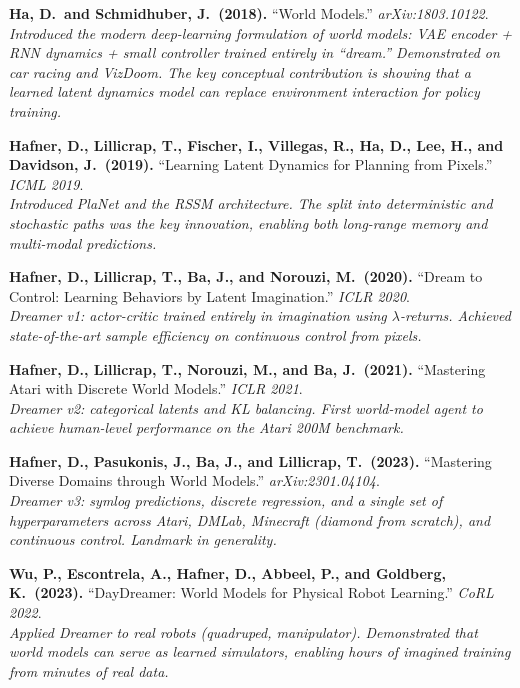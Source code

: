 \documentclass[11pt,a4paper]{article}
\theoremstyle{definition}
\begin{document}
\begin{enumerate}[label={[\arabic*]},leftmargin=2em]

\item \textbf{Ha, D.\ and Schmidhuber, J.\ (2018).}
  ``World Models.''
  \textit{arXiv:1803.10122}.\\
  \textit{Introduced the modern deep-learning formulation of world models:
  VAE encoder + RNN dynamics + small controller trained entirely in
  ``dream.'' Demonstrated on car racing and VizDoom. The key conceptual
  contribution is showing that a learned latent dynamics model can
  replace environment interaction for policy training.}

\item \textbf{Hafner, D., Lillicrap, T., Fischer, I., Villegas, R.,
  Ha, D., Lee, H., and Davidson, J.\ (2019).}
  ``Learning Latent Dynamics for Planning from Pixels.''
  \textit{ICML 2019}.\\
  \textit{Introduced PlaNet and the RSSM architecture. The split into
  deterministic and stochastic paths was the key innovation, enabling
  both long-range memory and multi-modal predictions.}

\item \textbf{Hafner, D., Lillicrap, T., Ba, J., and Norouzi, M.\ (2020).}
  ``Dream to Control: Learning Behaviors by Latent Imagination.''
  \textit{ICLR 2020}.\\
  \textit{Dreamer v1: actor-critic trained entirely in imagination using
  $\lambda$-returns. Achieved state-of-the-art sample efficiency on
  continuous control from pixels.}

\item \textbf{Hafner, D., Lillicrap, T., Norouzi, M., and Ba, J.\ (2021).}
  ``Mastering Atari with Discrete World Models.''
  \textit{ICLR 2021}.\\
  \textit{Dreamer v2: categorical latents and KL balancing. First world-model
  agent to achieve human-level performance on the Atari 200M benchmark.}

\item \textbf{Hafner, D., Pasukonis, J., Ba, J., and Lillicrap, T.\ (2023).}
  ``Mastering Diverse Domains through World Models.''
  \textit{arXiv:2301.04104}.\\
  \textit{Dreamer v3: symlog predictions, discrete regression, and a single
  set of hyperparameters across Atari, DMLab, Minecraft (diamond from
  scratch), and continuous control. Landmark in generality.}

\item \textbf{Wu, P., Escontrela, A., Hafner, D., Abbeel, P., and
  Goldberg, K.\ (2023).}
  ``DayDreamer: World Models for Physical Robot Learning.''
  \textit{CoRL 2022}.\\
  \textit{Applied Dreamer to real robots (quadruped, manipulator).
  Demonstrated that world models can serve as learned simulators,
  enabling hours of imagined training from minutes of real data.}


\end{enumerate}
\end{document}
